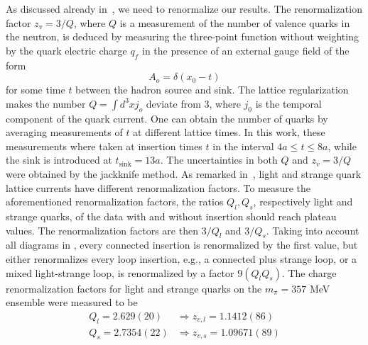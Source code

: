 As discussed already in~\cite{Engelhardt:2007ub, Engelhardt:2009ryp}, we need to renormalize our results. The renormalization factor $z_v=3/Q$, where $Q$ is a measurement of the number of valence quarks in the neutron, is
deduced by measuring the three-point function without weighting by the quark electric charge $q_f$ in the presence of an external gauge field of the form 
\begin{equation}
A_o=\delta(x_0-t)
\end{equation}
for some time $t$ between the hadron source and sink. The lattice regularization makes
the number $Q=\int d^3xj_o$ deviate from 3, where $j_0$ is the temporal component of the 
quark current. One can obtain the number of quarks by averaging
measurements of $t$ at different lattice times. In this work, these measurements
where taken at insertion times $t$ in the interval $4a\le t \le8a$, while 
the sink is introduced at $t_{\text{sink}}=13a$. The uncertainties in both $Q$ and
$z_v=3/Q$ were obtained by the jackknife method. As remarked in~\cite{Engelhardt:2009ryp},
light and strange quark lattice currents have different renormalization factors.
To measure the aforementioned renormalization factors, the ratios $Q_l, Q_s$,
respectively light and strange quarks, of the data with
and without insertion should reach plateau values. The renormalization factors are then
$3/Q_l$ and $3/Q_s$. Taking into account all diagrams in , every connected insertion is 
renormalized by the first value, but either renormalizes every loop insertion, e.g.,
a connected plus strange loop, or a mixed light-strange loop, is renormalized by a factor $9(Q_lQ_s)$.
The charge renormalization factors for light and strange quarks on the $m_{\pi}=357$ MeV ensemble were measured to be
\begin{align}
Q_l=2.629(20)&\Rightarrow z_{v,l}=1.1412(86)\\
Q_s=2.7354(22)&\Rightarrow z_{v,s}=1.09671(89)
\end{align}